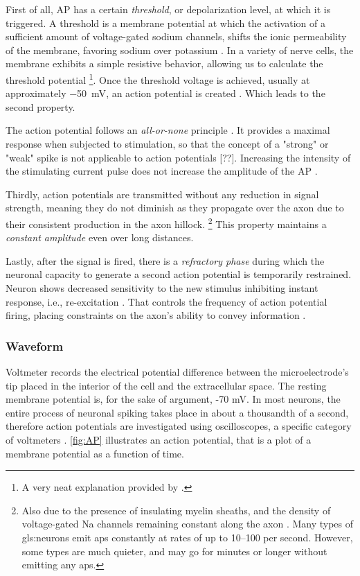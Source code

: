 \documentclass[class={myRUCProject}, crop=false]{standalone}
\begin{document}
First of all, AP has a certain \textit{threshold}, or depolarization level, at which it is triggered. A threshold is a membrane potential at which the activation of a sufficient amount of voltage-gated sodium channels, shifts the ionic permeability of the membrane, favoring sodium over potassium \cite{wood1996neuroscience}. In a variety of nerve cells, the membrane exhibits a simple resistive behavior, allowing us to calculate the threshold potential \footnote{A very neat explanation provided by \cite{kandel2000principles}.}. Once the threshold voltage is achieved, usually at approximately {\qty{-50}{\milli\volt}}, an action potential is created \cite{kandel2000principles}. Which leads to the second property. 

The action potential follows an \textit{all-or-none} principle \cite{kandel2000principles}. It provides a maximal response when subjected to stimulation, so that the concept of a "strong" or "weak" spike is not applicable to action potentials [??]. Increasing the intensity of the stimulating current pulse does not increase the amplitude of the AP \cite{Hammond2015ch3}.

Thirdly, action potentials are transmitted without any reduction in signal strength, meaning they do not diminish as they propagate over the axon due to their consistent production in the axon hillock.
\footnote{Also due to the presence of insulating myelin sheaths, and the density of voltage-gated \gls{Na} channels remaining constant along the axon \cite{Hammond2015ch4}. Many types of \glspl{gls:neuron} emit \glspl{ap} constantly at rates of up to 10–100 per second. However, some types are much quieter, and may go for minutes or longer without emitting any \glspl{ap}.}
This property maintains a \textit{constant amplitude} even over long distances.

Lastly, after the signal is fired, there is a \textit{refractory phase} during which the neuronal capacity to generate a second action potential is temporarily restrained. Neuron shows decreased sensitivity to the new stimulus inhibiting instant response, i.e., re-excitation \cite{kandel2000principles}. That controls the frequency of action potential firing, placing constraints on the axon's ability to convey information \cite{kandel2000principles}. 

\subsubsection{Waveform}

Voltmeter records the electrical potential difference between the microelectrode's tip placed in the interior of the cell and the extracellular space. The resting membrane potential is, for the sake of argument, -70 mV. In most neurons, the entire process of neuronal spiking takes place in about a thousandth of a second, therefore action potentials are investigated using oscilloscopes, a specific category of voltmeters \cite{wood1996neuroscience}. \cref{fig:AP} illustrates an action potential, that is a plot of a membrane potential as a function of time. 
\end{document}
